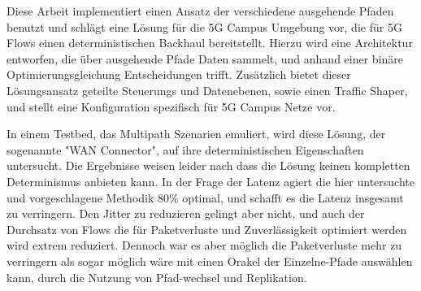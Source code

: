 Diese Arbeit implementiert einen Ansatz der verschiedene ausgehende Pfaden benutzt und schlägt eine Lösung für die 5G Campus Umgebung vor, die für 5G Flows einen deterministischen Backhaul bereitstellt. Hierzu wird eine Architektur entworfen, die über ausgehende Pfade Daten sammelt, und anhand einer binäre Optimierungsgleichung Entscheidungen trifft. Zusätzlich bietet dieser Lösungsansatz geteilte Steuerungs und Datenebenen, sowie einen Traffic Shaper, und stellt eine Konfiguration spezifisch für 5G Campus Netze vor.

In einem Testbed, das Multipath Szenarien emuliert, wird diese Lösung, der sogenannte "WAN Connector", auf ihre deterministischen Eigenschaften untersucht. Die Ergebnisse weisen leider nach dass die Lösung keinen kompletten Determinismus anbieten kann. In der Frage der Latenz agiert die hier untersuchte und vorgeschlagene Methodik 80\% optimal, und schafft es die Latenz insgesamt zu verringern. Den Jitter zu reduzieren gelingt aber nicht, und auch der Durchsatz von Flows die für Paketverluste und Zuverlässigkeit optimiert werden wird extrem reduziert. Dennoch war es aber möglich die Paketverluste mehr zu verringern als sogar möglich wäre mit einen Orakel der Einzelne-Pfade auswählen kann, durch die Nutzung von Pfad-wechsel und Replikation.
